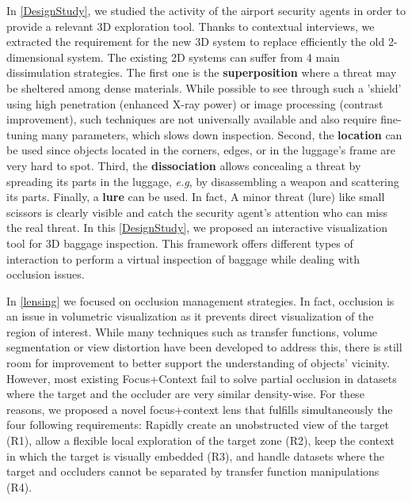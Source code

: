  
In \autoref{DesignStudy}, we studied the activity of the airport security agents in order to provide a relevant 3D exploration tool. Thanks to contextual interviews, we extracted the requirement for the new 3D system to replace efficiently the old 2-dimensional system. The existing 2D systems can suffer from 4 main dissimulation strategies. The first one is the \textbf{superposition} where a threat may be sheltered among dense materials. While possible to see through such a 'shield' using high penetration (enhanced X-ray power) or image processing (contrast improvement), such techniques are not universally available and also require fine-tuning many parameters, which slows down inspection. Second, the \textbf{location} can be used since objects located in the corners, edges, or in the luggage's frame are very hard to spot. Third, the \textbf{dissociation} allows concealing a threat by spreading its parts in the luggage, \emph{e.g}, by disassembling a weapon and scattering its parts. Finally, a \textbf{lure} can be used. In fact, A minor threat (lure) like small scissors is clearly visible and catch the security agent's attention who can miss the real threat. In this \autoref{DesignStudy}, we proposed an interactive visualization tool for 3D baggage inspection. This framework offers different types of interaction to perform a virtual inspection of baggage while dealing with occlusion issues.



In \autoref{lensing} we focused on occlusion management strategies. In fact, occlusion is an issue in volumetric visualization as it prevents direct visualization of the region of interest. While many techniques such as transfer functions, volume segmentation or view distortion have been developed to address this, there is still room for improvement to better support the understanding of objects' vicinity. However, most existing Focus+Context fail to solve partial occlusion in datasets where the target and the occluder are very similar density-wise. For these reasons, we proposed a novel focus+context lens that fulfills simultaneously the four following requirements: Rapidly create an unobstructed view of the target (R1), allow a flexible local exploration of the target zone (R2), keep the context in which the target is visually embedded (R3), and handle datasets where the target and occluders cannot  be separated by transfer function manipulations (R4).



